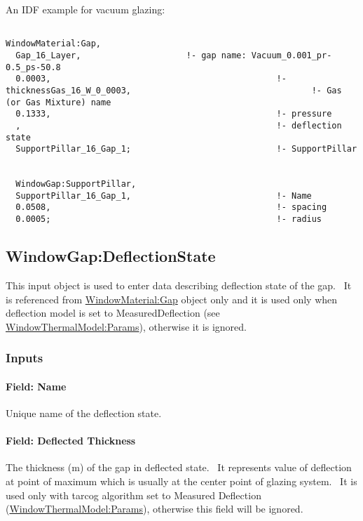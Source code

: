 An IDF example for vacuum glazing:

\begin{lstlisting}

WindowMaterial:Gap,
  Gap_16_Layer,                     !- gap name: Vacuum_0.001_pr-0.5_ps-50.8
  0.0003,                                             !- thicknessGas_16_W_0_0003,                                    !- Gas (or Gas Mixture) name
  0.1333,                                             !- pressure
  ,                                                   !- deflection state
  SupportPillar_16_Gap_1;                             !- SupportPillar


  WindowGap:SupportPillar,
  SupportPillar_16_Gap_1,                             !- Name
  0.0508,                                             !- spacing
  0.0005;                                             !- radius
\end{lstlisting}

\subsection{WindowGap:DeflectionState}\label{windowgapdeflectionstate}

This input object is used to enter data describing deflection state of the gap.~ It is referenced from \hyperref[windowmaterialgap]{WindowMaterial:Gap} object only and it is used only when deflection model is set to MeasuredDeflection (see \hyperref[windowthermalmodelparams]{WindowThermalModel:Params}), otherwise it is ignored.

\subsubsection{Inputs}\label{inputs-19-006}

\paragraph{Field: Name}\label{field-name-13-010}

Unique name of the deflection state.

\paragraph{Field: Deflected Thickness}\label{field-deflected-thickness}

The thickness (m) of the gap in deflected state.~ It represents value of deflection at point of maximum which is usually at the center point of glazing system.~ It is used only with tarcog algorithm set to Measured Deflection (\hyperref[windowthermalmodelparams]{WindowThermalModel:Params}), otherwise this field will be ignored.

